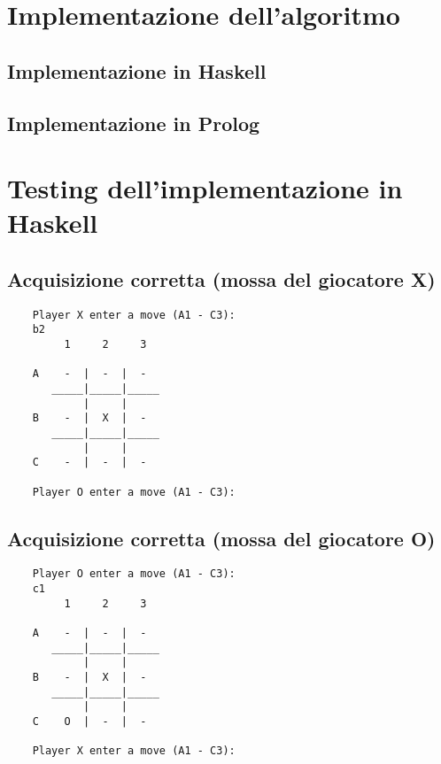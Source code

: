 \documentclass{article}
\begin{document}
\section{Implementazione dell'algoritmo}

\subsection{Implementazione in Haskell}


\newpage
\subsection{Implementazione in Prolog}


\newpage

\section{Testing dell'implementazione in Haskell}

\subsection{Acquisizione corretta (mossa del giocatore X)}
    \begin{verbatim}
    Player X enter a move (A1 - C3): 
    b2
         1     2     3

    A    -  |  -  |  -  
       _____|_____|_____
            |     |     
    B    -  |  X  |  -  
       _____|_____|_____
            |     |     
    C    -  |  -  |  -  

    Player O enter a move (A1 - C3): 
    \end{verbatim}

\subsection{Acquisizione corretta (mossa del giocatore O)}
    \begin{verbatim}
    Player O enter a move (A1 - C3): 
    c1
         1     2     3

    A    -  |  -  |  -  
       _____|_____|_____
            |     |     
    B    -  |  X  |  -  
       _____|_____|_____
            |     |     
    C    O  |  -  |  -  

    Player X enter a move (A1 - C3): 
    \end{verbatim}
\end{document}
